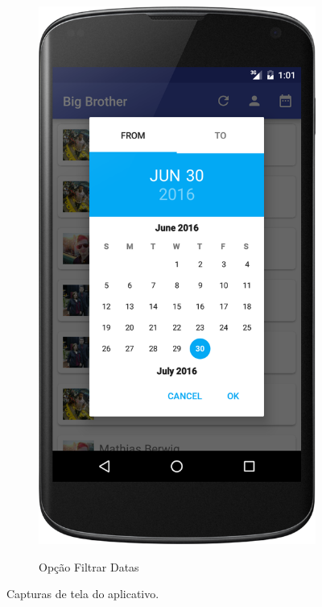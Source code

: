 \begin{figure}
\begin{subfigure}{.5\textwidth}
	\centering
	\caption{Opção Filtrar Datas}
	\includegraphics[scale=0.2]{imagens/android_filtrar_data.png}
	\label{android_filtrar_data}
\end{subfigure}
\caption{Capturas de tela do aplicativo.}
\label{android_screenshots}
\end{figure}